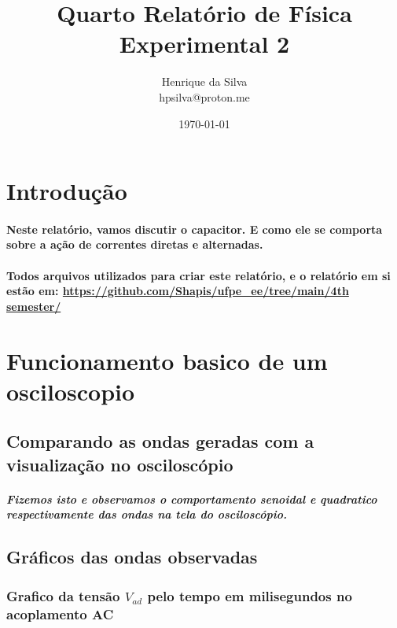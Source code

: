 \documentclass[12pt,twoside, a4paper, twocolumn]{article}
\title{Quarto Relatório de Física Experimental 2}
\author{Henrique da Silva \\ hpsilva@proton.me}
\date{\today}
\begin{document}
\maketitle
{}
\newpage
\tableofcontents
\newpage

\section{Introdução}

\paragraph*{Neste relatório, vamos discutir o capacitor. E como ele se comporta sobre a ação de correntes diretas e alternadas.}

\paragraph*{Todos arquivos utilizados para criar este relatório, e o relatório em si estão em:  \url{https://github.com/Shapis/ufpe_ee/tree/main/4th semester/}}


\section{Funcionamento basico de um osciloscopio}

\subsection{Comparando as ondas geradas com a visualização no osciloscópio}

\subparagraph*{Fizemos isto e observamos o comportamento senoidal e quadratico respectivamente das ondas na tela do osciloscópio.}

\subsection{Gráficos das ondas observadas}

\subsubsection{Grafico da tensão $V_{ad}$ pelo tempo em milisegundos no acoplamento AC}

\end{document}
